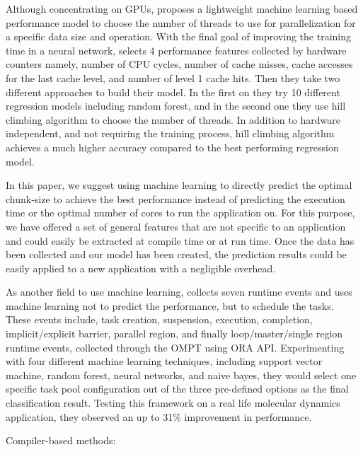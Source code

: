 	
\cite{pusukuri2011thread}
\cite{marin2004cross}


Although concentrating on GPUs,	\cite{liu2018runtime} proposes a lightweight machine learning based performance model to choose the number of threads to use for parallelization for a specific data size and operation. With the final goal of improving the training time in a neural network, \cite{liu2018runtime} selects 4 performance features collected by hardware counters namely, number of CPU cycles, number of cache misses, cache accesses for the last cache level, and number of level 1 cache hits. Then they take two different approaches to build their model. In the first on they try 10 different regression models including random forest, and in the second one they use hill climbing algorithm to choose the number of threads. In addition to hardware independent, and not requiring the training process, hill climbing algorithm achieves a much higher accuracy compared to the best performing regression model.

In this paper, we suggest using machine learning to directly predict the optimal chunk-size to achieve the best performance instead of predicting the execution time or the optimal number of cores to run the application on. For this purpose, we have offered a set of general features that are not specific to an application and could easily be extracted at compile time or at run time. Once the data has been collected and our model has been created, the prediction results could be easily applied to a new application with a negligible overhead. 


\cite{sun2017automated}


	
As another field to use machine learning, \cite{qawasmeh2015adaptive} collects seven runtime events and uses machine learning not to predict the performance, but to schedule the tasks. These events include, task creation, suspension, execution, completion, implicit/explicit barrier, parallel region, and finally loop/master/single region runtime events, collected through the OMPT using ORA API. Experimenting with four different machine learning techniques, including support vector machine, random forest, neural networks, and naive bayes, they would select one specific task pool configuration out of the three pre-defined options as the final classification result. Testing this framework on a real life molecular dynamics application, they observed an up to 31\% improvement in performance. 


Compiler-based methods:

